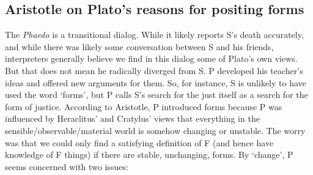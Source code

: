 \documentclass[oneside]{article}
\begin{document}
\subsection*{Aristotle on Plato's reasons for positing forms}
The \emph{Phaedo} is a transitional dialog. While it likely reports S's death accurately, and while there was likely some conversation between S and his friends, interpreters generally believe we find in this dialog some of Plato's own views. But that does not mean he radically diverged from S. P developed his teacher's ideas and offered new arguments for them. So, for instance, S is unlikely to have used the word `forms', but P calls S's search for the just itself as a search for the form of justice. According to Aristotle, P introduced forms because P was influenced by Heraclitus' and Cratylus' views that everything in the sensible/observable/material world is somehow changing or unstable. The worry was that we could only find a satisfying definition of F (and hence have knowledge of F things) if there are stable, unchanging, forms. By `change', P seems concerned with two issues: 
\end{document}
